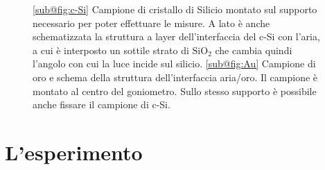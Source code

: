 \documentclass[prb,showpacs,floatfix,altaffilletter,amsmath,amssymb,reprint,citeautoscript]{revtex4-1}
\begin{document}
\begin{figure}
    \centering
    
    \caption{\ref{sub@fig:c-Si} Campione di  cristallo di Silicio montato sul supporto necessario per poter effettuare le misure. A lato è anche schematizzata la struttura a layer dell'interfaccia del c-Si con l'aria, a cui è interposto un sottile strato di $\mathrm{SiO_2}$ che cambia quindi l'angolo con cui la luce incide sul silicio. \ref{sub@fig:Au} Campione di oro e schema della struttura dell'interfaccia aria/oro. Il campione è montato al centro del goniometro. Sullo stesso supporto è possibile anche fissare il campione di c-Si.}
    \label{fig:c-Si/Au_samples}
\end{figure}

\section{L'esperimento}
\end{document}
